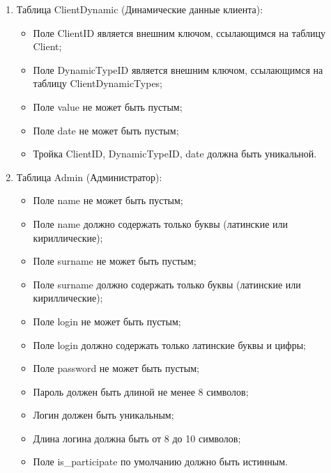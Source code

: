 \begin{enumerate}
    \item Таблица ClientDynamic (Динамические данные клиента):
    \begin{itemize}
        \item[---] Поле ClientID является внешним ключом, ссылающимся на таблицу Client;
        \item[---] Поле DynamicTypeID является внешним ключом, ссылающимся на таблицу ClientDynamicTypes;
        \item[---] Поле value не может быть пустым;
        \item[---] Поле date не может быть пустым;
        \item[---] Тройка ClientID, DynamicTypeID, date должна быть уникальной.
    \end{itemize}

    \item Таблица Admin (Администратор):
    \begin{itemize}
        \item[---] Поле name не может быть пустым;
        \item[---] Поле name должно содержать только буквы (латинские или кириллические);
        \item[---] Поле surname не может быть пустым;
        \item[---] Поле surname должно содержать только буквы (латинские или кириллические);
        \item[---] Поле login не может быть пустым;
        \item[---] Поле login должно содержать только латинские буквы и цифры;
        \item[---] Поле password не может быть пустым;
        \item[---] Пароль должен быть длиной не менее 8 символов;
        \item[---] Логин должен быть уникальным;
        \item[---] Длина логина должна быть от 8 до 10 символов;
        \item[---] Поле is\_participate по умолчанию должно быть истинным.
    \end{itemize}


\end{enumerate}
